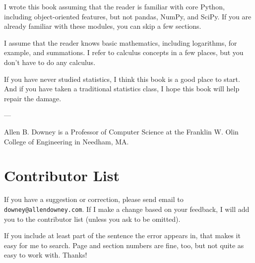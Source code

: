 \documentclass[12pt]{book}
\begin{document}
I wrote this book assuming that the reader is familiar with core Python,
including object-oriented features, but not pandas,
NumPy, and SciPy.  If you are already familiar with these modules, you
can skip a few sections.

I assume that the reader knows basic mathematics, including
logarithms, for example, and summations.  I refer to calculus concepts
in a few places, but you don't have to do any calculus.

If you have never studied statistics, I think this book is a good place
to start.  And if you have taken
a traditional statistics class, I hope this book will help repair the
damage.



---

Allen B. Downey is a Professor of Computer Science at 
the Franklin W. Olin College of Engineering in Needham, MA.




\section*{Contributor List}

If you have a suggestion or correction, please send email to 
\verb"downey@allendowney.com".  If I make a change based on your
feedback, I will add you to the contributor list
(unless you ask to be omitted).

If you include at least part of the sentence the
error appears in, that makes it easy for me to search.  Page and
section numbers are fine, too, but not quite as easy to work with.
Thanks!

\small
\end{document}
